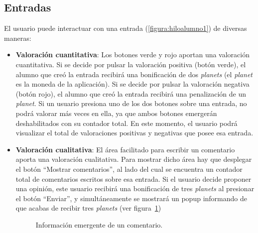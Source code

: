 \documentclass[a4paper, 12pt]{book}
\begin{document}
\subsection{Entradas}
El usuario puede interactuar con una entrada (\ref{figura:hiloalumno1}) de diversas maneras:
\begin{itemize}
  \item {\bfseries Valoraci\'on cuantitativa}: Los botones verde y rojo aportan una valoraci\'on cuantitativa. Si se decide por pulsar 
  la valoraci\'on positiva (bot\'on verde), el alumno que cre\'o la entrada recibir\'a una bonificaci\'on de dos \textit{planets} (el \textit{planet} es la 
  moneda de la aplicaci\'on). Si se decide por pulsar la valoraci\'on negativa (bot\'on rojo), el alumno que cre\'o la entrada recibir\'a una penalizaci\'on 
  de un \textit{planet}. Si un usuario presiona uno de los dos botones sobre una entrada, no podr\'a valorar m\'as veces en ella, ya que ambos botones 
  emerger\'an deshabilitados con su contador total. En este momento, el usuario podr\'a visualizar el total de valoraciones positivas y negativas que posee 
  esa entrada.
  \item {\bfseries Valoraci\'on cualitativa}: El \'area facilitado para escribir un comentario aporta una valoraci\'on cualitativa. Para mostrar dicho 
  \'area hay que desplegar el bot\'on ``Mostrar comentarios'', al lado del cual se encuentra un contador total de comentarios escritos sobre esa entrada.
  Si el usuario decide proponer una opini\'on, este usuario recibir\'a una bonificaci\'on de tres \textit{planets} al presionar el bot\'on ``Enviar'', y 
  simult\'aneamente se mostrar\'a un popup informando de que acabas de recibir tres \textit{planets} (ver figura~\ref{figura:hiloalumno6})
  \begin{figure}[htbp] 
    \centering
    \caption{Informaci\'on emergente de un comentario.}
    \label{figura:hiloalumno6}
  \end{figure}
  

\end{itemize}
\end{document}
